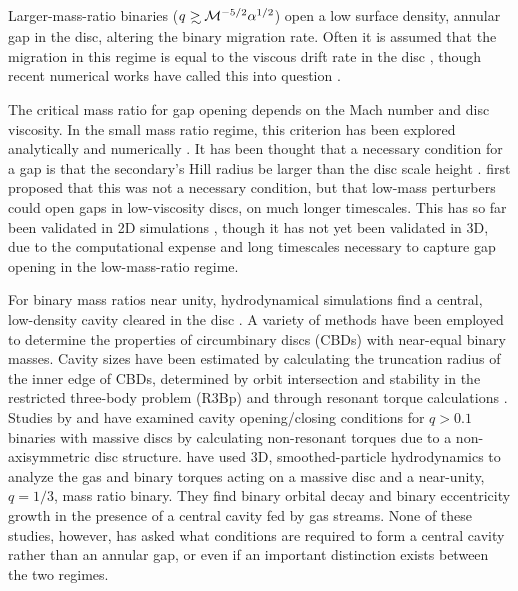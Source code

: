 \documentclass[usenatbib]{mnras}
\newcommand\gsim{\mathrel{\rlap{\lower4pt\hbox{\hskip1pt$\sim$}}
        \raise1pt\hbox{$>$}}}
\def\Mach{\mathcal{M}}
\begin{document}
Larger-mass-ratio binaries ($q \gsim \Mach^{-5/2}\alpha^{1/2}$) open a low surface density, annular gap in the disc, altering the binary migration rate. Often it is assumed that the migration in this regime is equal to the viscous drift rate in the disc \citep{LinPapa86b, NelsonKley:2000, DAngelowLubow:2008}, though recent numerical works have called this into question  \citep{Edgar:2008, DuffellFTV:2014, DurmannKley:2015}.

The critical mass ratio for gap opening depends on the Mach number and disc viscosity. In the small mass ratio regime, this criterion has been explored analytically \citep[{\em e.g.},][]{GT79, GT80, PapaPringle:1977} and numerically \citep[{\em e.g.},][]{Bryden:1999, NelsonKley:2000,Papa:2004:MHDGapopen, Zhu:2013:GapOpen}. It has been thought that a necessary condition for a gap is that the secondary's Hill radius be larger than the disc scale height \citep{LinPapa:1993:ConfProcRev, CMM:2006}. \cite{GoodmanRafikov:2001} first proposed that this was not a necessary condition, but that low-mass perturbers could open gaps in low-viscosity discs, on much longer timescales. This has so far been validated in 2D simulations \citep{DongRafII:2011, DM2012:gaps, DuffellMac:2013:smallqGapOpen, FungGaps:2014}, though it has not yet been validated in 3D, due to the computational expense and long timescales necessary to capture gap opening in the low-mass-ratio regime.



For binary mass ratios near unity, hydrodynamical simulations find a 
central, low-density cavity cleared in the disc 
\citep[{\em e.g.},][]{Artymowicz:1994, ArtyLubow:1996, Farris:2014}. 
A variety of methods have been employed to determine the properties 
of circumbinary discs (CBDs) with near-equal binary masses. 
Cavity sizes have been estimated by calculating the truncation radius of the 
inner edge of CBDs, determined by orbit intersection 
and stability in the restricted three-body problem (R3Bp) \citep{RP:Excretion:1981} 
and through resonant torque calculations \citep{Artymowicz:1994, 
ArtyLubow:1996}. Studies by \cite{delValleEscala:I:2012} and \cite{delValleEscala:II:2014} have examined 
cavity opening/closing conditions for $q>0.1$ binaries with massive discs by 
calculating non-resonant torques due to a non-axisymmetric disc structure. 
\cite{Roedig:2012:Trqs} have used 3D, 
smoothed-particle hydrodynamics to analyze the gas and binary
torques acting on a massive disc and a near-unity, $q=1/3$, 
mass ratio binary. They find binary orbital decay and binary eccentricity 
growth in the presence of a central cavity fed by gas streams.
None of these studies, however, has asked what conditions are 
required to form a central cavity rather than an annular gap, 
or even if an important distinction exists between the two regimes.
\end{document}
